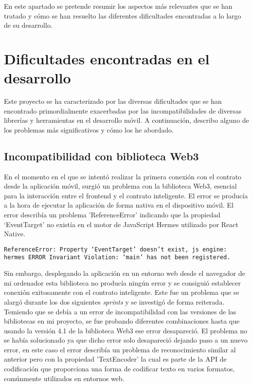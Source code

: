 
En este apartado se pretende resumir los aspectos más relevantes que se han tratado y cómo se han resuelto las diferentes dificultades encontradas a lo largo de su desarrollo.



\section{Dificultades encontradas en el desarrollo}

Este proyecto se ha caracterizado por las diversas dificultades que se han encontrado primordialmente exacerbadas por las incompatibilidades de diversas librerías y herramientas en el desarrollo móvil.
A continuación, describo alguno de los problemas más significativos y cómo los he abordado.

\subsection{Incompatibilidad con biblioteca Web3}

En el momento en el que se intentó realizar la primera conexión con el contrato desde la aplicación móvil, surgió un problema con la biblioteca Web3, esencial para la interacción entre el frontend y el contrato inteligente.
El error se producía a la hora de ejecutar la aplicación de forma nativa en el dispositivo móvil.
El error describía un problema 'ReferenceError' indicando que la propiedad `EventTarget' no existía en el motor de JavaScript Hermes utilizado por React Native. 

\texttt{ReferenceError: Property `EventTarget' doesn't exist, js engine: hermes ERROR Invariant Violation: `main' has not been registered.}

Sin embargo, desplegando la aplicación en un entorno web desde el navegador de mi ordenador esta biblioteca no producía ningún error y se consiguió establecer conexión exitosamente con el contrato inteligente.
Este fue un problema que se alargó durante los dos siguientes \textit{sprints} y se investigó de forma reiterada. Temiendo que se debía a un error de incompatibilidad con las versiones de las bibliotecas en mi proyecto, se fue probando diferentes combinaciones hasta que usando la versión 4.1 de la biblioteca Web3 ese error desapareció.
El problema no se había solucionado ya que dicho error solo desapareció dejando paso a un nuevo error, en este caso el error describía un problema de reconocimiento similar al anterior pero con la propiedad 'TextEncoder' la cual es parte de la API de codificación que proporciona una forma de codificar texto en varios formatos, comúnmente utilizados en entornos web.

